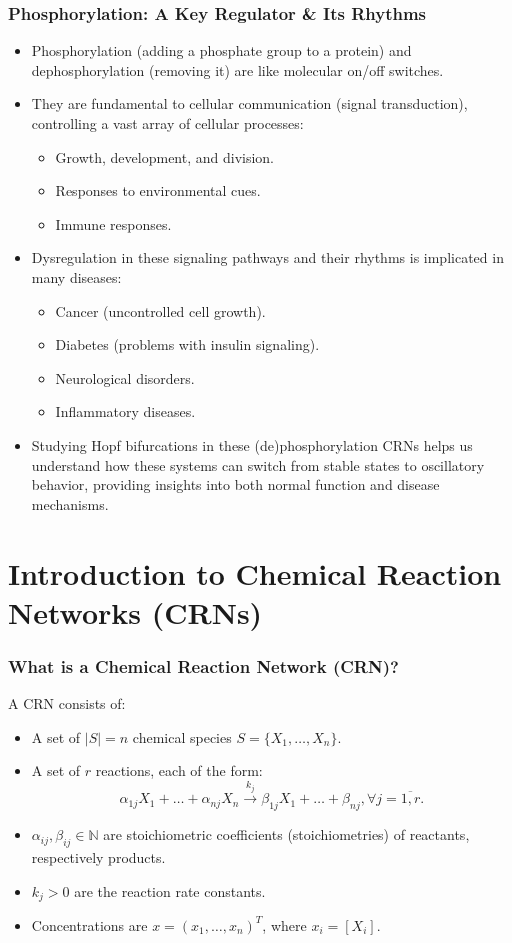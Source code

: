 \documentclass[aspectratio=169]{beamer}
\begin{document}
\begin{frame}{\insertsectionhead}
	\frametitle{Phosphorylation: A Key Regulator \& Its Rhythms}
	\begin{itemize}
		\item \alert{Phosphorylation} (adding a phosphate group to a protein) and \alert{dephosphorylation} (removing it) are like molecular on/off switches.
		\item They are fundamental to \alert{cellular communication (signal transduction)}, controlling a vast array of cellular processes:
			\begin{itemize}
				\item Growth, development, and division.
				\item Responses to environmental cues.
				\item Immune responses.
			\end{itemize}
		\item \alert{Dysregulation} in these signaling pathways and their rhythms is implicated in many diseases:
			\begin{itemize}
				\item Cancer (uncontrolled cell growth).
				\item Diabetes (problems with insulin signaling).
				\item Neurological disorders.
				\item Inflammatory diseases.
			\end{itemize}
		\item Studying \alert{Hopf bifurcations} in these (de)phosphorylation CRNs helps us understand how these systems can switch from stable states to oscillatory behavior, providing insights into both normal function and disease mechanisms.
	\end{itemize}
\end{frame}

\section{Introduction to Chemical Reaction Networks (CRNs)}

\begin{frame}{\insertsectionhead}
	\frametitle{What is a Chemical Reaction Network (CRN)?}
	A CRN consists of:
	\begin{itemize}
		\item A set of $\left|S\right| = n$ chemical \alert{species} $S = \{X_1, \dots, X_n\}$.
		\item A set of $r$ \alert{reactions}, each of the form:
			\[
				\alpha_{1j} X_1 + \dots + \alpha_{n j} X_n \xrightarrow{k_j} \beta_{1j} X_1 + \dots + \beta_{n j}, \forall j = \overline{1,r}.	
			\]
		\item $\alpha_{ij}, \beta_{ij} \in \mathbb{N}$ are \alert{stoichiometric coefficients} (stoichiometries) of reactants, respectively products.
		\item $k_j > 0$ are the \alert{reaction rate constants}.
		\item Concentrations are $x = (x_1, \dots, x_n)^T$, where $x_i = [X_i]$.
	\end{itemize}
\end{frame}
\end{document}
